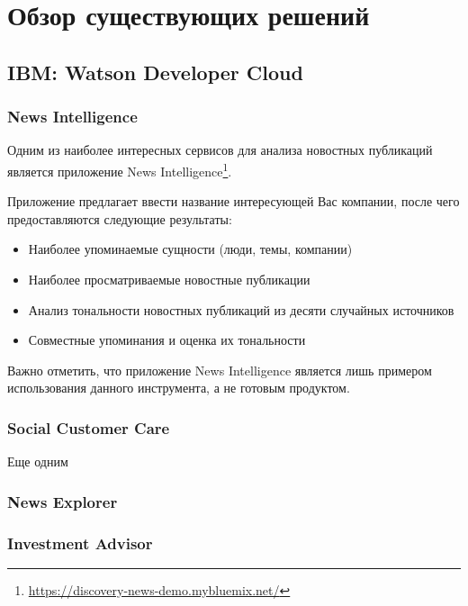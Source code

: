 \section{Обзор существующих решений}

\subsection{IBM: Watson Developer Cloud}

\subsubsection{News Intelligence}

Одним из наиболее интересных сервисов для анализа новостных публикаций является приложение News Intelligence\footnote{\url{https://discovery-news-demo.mybluemix.net/}}.

Приложение предлагает ввести название интересующей Вас компании, после чего предоставляются следующие результаты:

\begin{itemize}

\item Наиболее упоминаемые сущности (люди, темы, компании)

\item Наиболее просматриваемые новостные публикации

\item Анализ тональности новостных публикаций из десяти случайных источников

\item Совместные упоминания и оценка их тональности

\end{itemize}

Важно отметить, что приложение News Intelligence является лишь примером использования данного инструмента, а не готовым продуктом.

\subsubsection{Social Customer Care}

Еще одним

\subsubsection{News Explorer}

\subsubsection{Investment Advisor}

